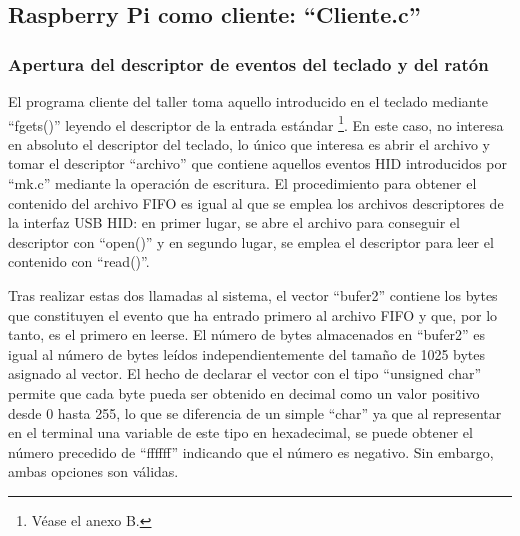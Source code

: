 \subsection{Raspberry Pi como cliente: ``Cliente.c''} \label{s3_5_1}

\subsubsection{Apertura del descriptor de eventos del teclado y del ratón}\label{s3_5_1_1}

El programa cliente del taller toma aquello introducido en el teclado mediante ``fgets()'' leyendo el descriptor de la entrada estándar \footnote{Véase el anexo B.}. En este caso, no interesa en absoluto el descriptor del teclado, lo único que interesa es abrir el archivo y tomar el descriptor ``archivo'' que contiene aquellos eventos HID introducidos por ``mk.c'' mediante la operación de escritura. El procedimiento para obtener el contenido del archivo FIFO es igual al que se emplea los archivos descriptores de la interfaz USB HID: en primer lugar, se abre el archivo para conseguir el descriptor con ``open()'' y en segundo lugar, se emplea el descriptor para leer el contenido con ``read()''. 


Tras realizar estas dos llamadas al sistema, el vector ``bufer2'' contiene los bytes que constituyen el evento que ha entrado primero al archivo FIFO y que, por lo tanto, es el primero en leerse. El número de bytes almacenados en ``bufer2'' es igual al número de bytes leídos independientemente del tamaño  de 1025 bytes asignado al vector. El hecho de declarar el vector con el tipo ``unsigned char'' permite que cada byte pueda ser obtenido en decimal como un valor positivo desde 0 hasta 255, lo que se diferencia de un simple ``char'' ya que al representar en el terminal una variable de este tipo en hexadecimal, se puede obtener el número precedido de ``ffffff'' indicando que el número es negativo. Sin embargo, ambas opciones son válidas.

